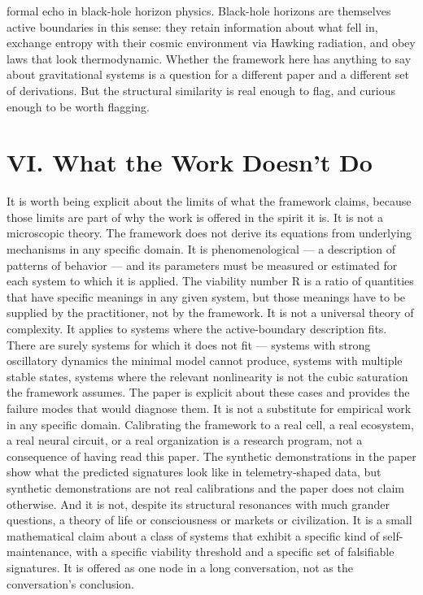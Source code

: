 \documentclass[12pt]{article}
\begin{document}
formal echo in black-hole horizon physics. Black-hole horizons are themselves active boundaries in this sense: they retain information about what fell in, exchange entropy with their cosmic environment via Hawking radiation, and obey laws that look thermodynamic. Whether the framework here has anything to say about gravitational systems is a question for a different paper and a different set of derivations. But the structural similarity is real enough to flag, and curious enough to be worth flagging.


\section*{VI. What the Work Doesn't Do}

It is worth being explicit about the limits of what the framework claims, because those limits are part of why the work is offered in the spirit it is. It is not a microscopic theory. The framework does not derive its equations from underlying mechanisms in any specific domain. It is phenomenological --- a description of patterns of behavior --- and its parameters must be measured or estimated for each system to which it is applied. The viability number R is a ratio of quantities that have specific meanings in any given system, but those meanings have to be supplied by the practitioner, not by the framework. It is not a universal theory of complexity. It applies to systems where the active-boundary description fits. There are surely systems for which it does not fit --- systems with strong oscillatory dynamics the minimal model cannot produce, systems with multiple stable states, systems where the relevant nonlinearity is not the cubic saturation the framework assumes. The paper is explicit about these cases and provides the failure modes that would diagnose them. It is not a substitute for empirical work in any specific domain. Calibrating the framework to a real cell, a real ecosystem, a real neural circuit, or a real organization is a research program, not a consequence of having read this paper. The synthetic demonstrations in the paper show what the predicted signatures look like in telemetry-shaped data, but synthetic demonstrations are not real calibrations and the paper does not claim otherwise. And it is not, despite its structural resonances with much grander questions, a theory of life or consciousness or markets or civilization. It is a small mathematical claim about a class of systems that exhibit a specific kind of self-maintenance, with a specific viability threshold and a specific set of falsifiable signatures. It is offered as one node in a long conversation, not as the conversation's conclusion.
\end{document}

